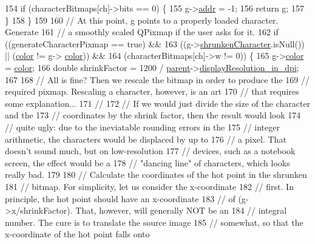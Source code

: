 \begin{DoxyCode}
{154     \textcolor{keywordflow}{if} (characterBitmaps[ch]->bits == 0) \{
155       g->\hyperlink{classglyph_a11666f9bdd93248a6c58b69113cbd7b0}{addr} = -1;
156       \textcolor{keywordflow}{return} g;
157     \}
158   \}
159 
160   \textcolor{comment}{// At this point, g points to a properly loaded character. Generate}
161   \textcolor{comment}{// a smoothly scaled QPixmap if the user asks for it.}
162   \textcolor{keywordflow}{if} ((generateCharacterPixmap == \textcolor{keyword}{true}) &&
163       ((g->\hyperlink{classglyph_aeefa28a926bdd7a24595dbdc7cdf504c}{shrunkenCharacter}.isNull()) || (\hyperlink{classglyph_ab4847af7a7b13322d5651fe47735c8dd}{color} != g->
      \hyperlink{classglyph_ab4847af7a7b13322d5651fe47735c8dd}{color})) &&
164       (characterBitmaps[ch]->w != 0)) \{
165     g->\hyperlink{classglyph_ab4847af7a7b13322d5651fe47735c8dd}{color} = \hyperlink{classglyph_ab4847af7a7b13322d5651fe47735c8dd}{color};
166     \textcolor{keywordtype}{double} shrinkFactor = 1200 / \hyperlink{classTeXFont_a72d8eb1f0377749cf4a45dfabf1c3dd5}{parent}->\hyperlink{classTeXFontDefinition_a08e27df7d9764c43308c5637906658c5}{displayResolution\_in\_dpi};
167 
168     \textcolor{comment}{// All is fine? Then we rescale the bitmap in order to produce the}
169     \textcolor{comment}{// required pixmap.  Rescaling a character, however, is an art}
170     \textcolor{comment}{// that requires some explanation...}
171     \textcolor{comment}{//}
172     \textcolor{comment}{// If we would just divide the size of the character and the}
173     \textcolor{comment}{// coordinates by the shrink factor, then the result would look}
174     \textcolor{comment}{// quite ugly: due to the ineviatable rounding errors in the}
175     \textcolor{comment}{// integer arithmetic, the characters would be displaced by up to}
176     \textcolor{comment}{// a pixel. That doesn't sound much, but on low-resolution}
177     \textcolor{comment}{// devices, such as a notebook screen, the effect would be a}
178     \textcolor{comment}{// "dancing line" of characters, which looks really bad.}
179 
180     \textcolor{comment}{// Calculate the coordinates of the hot point in the shrunken}
181     \textcolor{comment}{// bitmap. For simplicity, let us consider the x-coordinate}
182     \textcolor{comment}{// first. In principle, the hot point should have an x-coordinate}
183     \textcolor{comment}{// of (g->x/shrinkFactor). That, however, will generally NOT be an}
184     \textcolor{comment}{// integral number. The cure is to translate the source image}
185     \textcolor{comment}{// somewhat, so that the x-coordinate of the hot point falls onto}
}
\end{DoxyCode}
